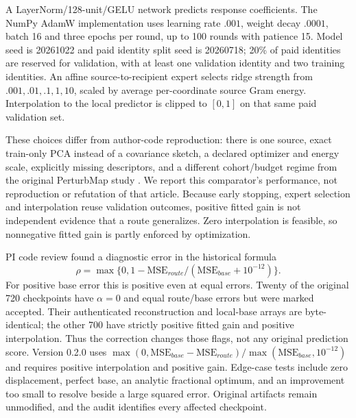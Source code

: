 A LayerNorm/128-unit/GELU network predicts response coefficients. The NumPy AdamW implementation uses learning rate $.001$, weight decay $.0001$, batch 16 and three epochs per round, up to 100 rounds with patience 15. Model seed is 20261022 and paid identity split seed is 20260718; 20\% of paid identities are reserved for validation, with at least one validation identity and two training identities. An affine source-to-recipient expert selects ridge strength from $.001,.01,.1,1,10$, scaled by average per-coordinate source Gram energy. Interpolation to the local predictor is clipped to $[0,1]$ on that same paid validation set.

These choices differ from author-code reproduction: there is one source, exact train-only PCA instead of a covariance sketch, a declared optimizer and energy scale, explicitly missing descriptors, and a different cohort/budget regime from the original PerturbMap study \citep{perturbmap2026}. We report this comparator's performance, not reproduction or refutation of that article. Because early stopping, expert selection and interpolation reuse validation outcomes, positive fitted gain is not independent evidence that a route generalizes. Zero interpolation is feasible, so nonnegative fitted gain is partly enforced by optimization.

PI code review found a diagnostic error in the historical formula
\begin{equation}
 \rho=\max\{0,1-\mathrm{MSE}_{route}/(\mathrm{MSE}_{base}+10^{-12})\}.
\end{equation} For positive base error this is positive even at equal errors. Twenty of the original 720 checkpoints have $\alpha=0$ and equal route/base errors but were marked accepted. Their authenticated reconstruction and local-base arrays are byte-identical; the other 700 have strictly positive fitted gain and positive interpolation. Thus the correction changes those flags, not any original prediction score. Version 0.2.0 uses $\max(0,\mathrm{MSE}_{base}-\mathrm{MSE}_{route})/\max(\mathrm{MSE}_{base},10^{-12})$ and requires positive interpolation and positive gain. Edge-case tests include zero displacement, perfect base, an analytic fractional optimum, and an improvement too small to resolve beside a large squared error. Original artifacts remain unmodified, and the audit identifies every affected checkpoint.

